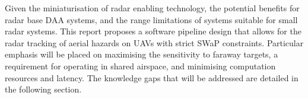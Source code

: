 Given the miniaturisation of radar enabling technology, the potential benefits for radar base DAA systems, and the range limitations of systems suitable for small radar systems. This report proposes a software pipeline design that allows for the radar tracking of aerial hazards on UAVs with strict SWaP constraints. Particular emphasis will be placed on maximising the sensitivity to faraway targets, a requirement for operating in shared airspace, and minimising computation resources and latency. The knowledge gaps that will be addressed are detailed in the following section. 